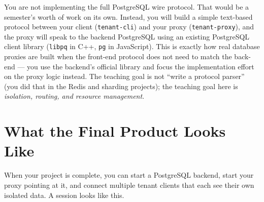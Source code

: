\documentclass[11pt,a4paper]{article}
\begin{document}
You are not implementing the full PostgreSQL wire protocol. That would be a semester's worth of work on its own. Instead, you will build a simple text-based protocol between your client (\texttt{tenant-cli}) and your proxy (\texttt{tenant-proxy}), and the proxy will speak to the backend PostgreSQL using an existing PostgreSQL client library (\texttt{libpq} in C++, \texttt{pg} in JavaScript). This is exactly how real database proxies are built when the front-end protocol does not need to match the back-end --- you use the backend's official library and focus the implementation effort on the proxy logic instead. The teaching goal is not ``write a protocol parser'' (you did that in the Redis and sharding projects); the teaching goal here is \textit{isolation, routing, and resource management}.

\section{What the Final Product Looks Like}

When your project is complete, you can start a PostgreSQL backend, start your proxy pointing at it, and connect multiple tenant clients that each see their own isolated data. A session looks like this.
\end{document}
